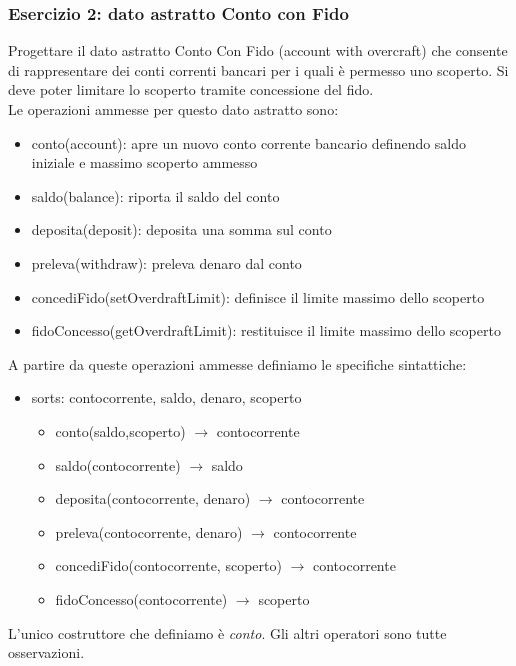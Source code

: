 \documentclass{article}
\begin{document}
	\subsubsection*{Esercizio 2: dato astratto Conto con Fido}
	Progettare il dato astratto Conto Con Fido (account with overcraft) che consente di rappresentare dei conti correnti bancari per i quali è permesso uno scoperto. Si deve poter limitare lo scoperto tramite concessione del fido. \\
	Le operazioni ammesse per questo dato astratto sono:
	\begin{itemize}
		\item conto(account): apre un nuovo conto corrente bancario definendo saldo iniziale e massimo scoperto ammesso
		\item saldo(balance): riporta il saldo del conto
		\item deposita(deposit): deposita una somma sul conto
		\item preleva(withdraw): preleva denaro dal conto
		\item concediFido(setOverdraftLimit): definisce il limite massimo dello scoperto
		\item fidoConcesso(getOverdraftLimit): restituisce il limite massimo dello scoperto
	\end{itemize}
	A partire da queste operazioni ammesse definiamo le specifiche sintattiche:
	\begin{itemize}
		\item sorts: contocorrente, saldo, denaro, scoperto
		\begin{itemize}
			\item conto(saldo,scoperto) $\rightarrow$ contocorrente
			\item saldo(contocorrente) $\rightarrow$ saldo
			\item deposita(contocorrente, denaro) $\rightarrow$ contocorrente
			\item preleva(contocorrente, denaro) $\rightarrow$ contocorrente
			\item concediFido(contocorrente, scoperto) $\rightarrow$ contocorrente
			\item fidoConcesso(contocorrente) $\rightarrow$ scoperto
		\end{itemize}
	\end{itemize}
	L'unico costruttore che definiamo è \textit{conto}. Gli altri operatori sono tutte osservazioni.
\end{document}
